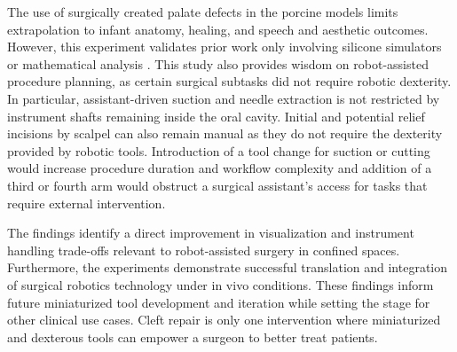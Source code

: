 The use of surgically created palate defects in the porcine models limits extrapolation to infant anatomy, healing, and speech and aesthetic outcomes. However, this experiment validates prior work only involving silicone simulators or mathematical analysis \cite{podolsky2017simulator}\cite{maguire2025}. 
This study also provides wisdom on robot-assisted procedure planning, as certain surgical subtasks did not require robotic dexterity. In particular, assistant-driven suction and needle extraction is not restricted by instrument shafts remaining inside the oral cavity. Initial and potential relief incisions by scalpel can also remain manual as they do not require the dexterity provided by robotic tools. Introduction of a tool change for suction or cutting would increase procedure duration and workflow complexity and addition of a third or fourth arm would obstruct a surgical assistant's access for tasks that require external intervention.

The findings identify a direct improvement in visualization and instrument handling trade-offs relevant to robot-assisted surgery in confined spaces. Furthermore, the experiments demonstrate successful translation and integration of surgical robotics technology under in vivo conditions. These findings inform future miniaturized tool development and iteration while setting the stage for other clinical use cases. Cleft repair is only one intervention where miniaturized and dexterous tools can empower a surgeon to better treat patients.
